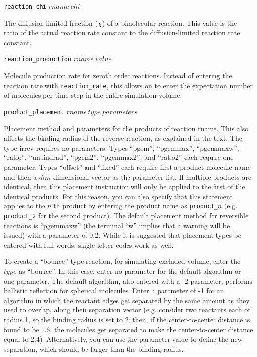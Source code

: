 \documentclass {scrbook}
\newcommand {\ttt} {\texttt}
\begin{document}
\begin{description}
\item{\ttt{reaction\_chi} $rname\ chi$}

The diffusion-limited fraction ($\chi$) of a bimolecular reaction. This value is the ratio of the actual reaction rate constant to the diffusion-limited reaction rate constant.

\item{\ttt{reaction\_production} $rname\ value$}

Molecule production rate for zeroth order reactions. Instead of entering the reaction rate with \ttt{reaction\_rate}, this allows on to enter the expectation number of molecules per time step in the entire simulation volume.

\item{\ttt{product\_placement} $rname\ type\ parameters$}

Placement method and parameters for the products of reaction rname. This also affects the binding radius of the reverse reaction, as explained in the text. The type irrev requires no parameters. Types ``pgem'', ``pgemmax'', ``pgemmaxw'', ``ratio'', ``unbindrad'', ``pgem2'', ``pgemmax2'', and ``ratio2'' each require one parameter. Types ``offset'' and ``fixed'' each require first a product molecule name and then a $dim$-dimensional vector as the parameter list. If multiple products are identical, then this placement instruction will only be applied to the first of the identical products. For this reason, you can also specify that this statement applies to the $n$'th product by entering the product name as \ttt{product\_}$n$ (e.g. \ttt{product\_2} for the second product). The default placement method for reversible reactions is ``pgemmaxw'' (the terminal ``w'' implies that a warning will be issued) with a parameter of 0.2. While it is suggested that placement types be entered with full words, single letter codes work as well.

To create a ``bounce'' type reaction, for simulating excluded volume, enter the $type$ as ``bounce''. In this case, enter no parameter for the default algorithm or one parameter. The default algorithm, also entered with a -2 parameter, performs ballistic reflection for spherical molecules. Enter a parameter of -1 for an algorithm in which the reactant edges get separated by the same amount as they used to overlap, along their separation vector (e.g. consider two reactants each of radius 1, so the binding radius is set to 2; then, if the center-to-center distance is found to be 1.6, the molecules get separated to make the center-to-center distance equal to 2.4). Alternatively, you can use the parameter value to define the new separation, which should be larger than the binding radius.


\end{description}
\end{document}
